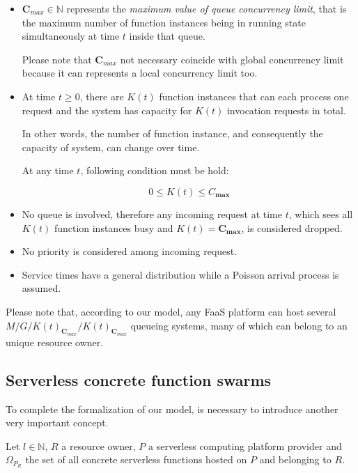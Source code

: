 \documentclass[12pt,a4paper]{report}
\newcommand*{\N}{\mathbb{N}}
\theoremstyle{definition}
\begin{document}
\begin{itemize}
	
	\item $\textbf{C}_{max} \in \N$ represents the \textit{maximum value of queue concurrency limit}, that is the maximum number of function instances being in running state simultaneously at time $t$ inside that queue. 
	
	Please note that $\textbf{C}_{max}$ not necessary coincide with global concurrency limit because it can represents a local concurrency limit too.
	
	\item At time $t \geq 0$, there are $K(t)$ function instances that can each process one request and the system has capacity for $K(t)$ invocation requests in total. 
	
	In other words, the number of function instance, and consequently the capacity of system, can change over time. 
	
	At any time $t$, following condition must be hold:
	
	\begin{equation}
		0 \leq K(t) \leq {C}_{\textbf{max}}
	\end{equation}
	
	\item No queue is involved, therefore any incoming request at time $t$, which sees all $K(t)$ function instances busy and $K(t) = \textbf{C}_{\textbf{max}}$, is considered dropped.
	
	\item No priority is considered among incoming request.
	
	\item Service times have a general distribution while a Poisson arrival process is assumed.
\end{itemize} 

Please note that, according to our model, any FaaS platform can host several $M/G/K(t)_{\textbf{C}_{max}}/K(t)_{\textbf{C}_{max}}$ queueing systems, many of which can belong to an unique resource owner.  

\subsection{Serverless concrete function swarms}

To complete the formalization of our model, is necessary to introduce another very important concept.

Let $l \in \N$, $R$ a resource owner, $P$ a serverless computing platform provider and $\Omega_{P_R}$ the set of all concrete serverless functions hosted on $P$ and belonging to $R$. 
\end{document}
